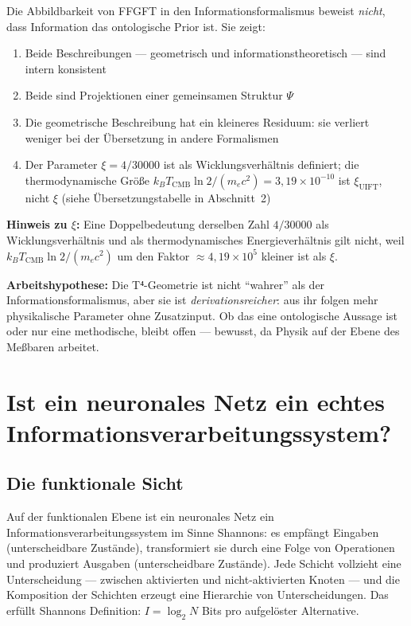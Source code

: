 Die Abbildbarkeit von FFGFT in den Informationsformalismus beweist
\emph{nicht}, dass Information das ontologische Prior ist. Sie zeigt:

\begin{enumerate}
  \item Beide Beschreibungen --- geometrisch und informationstheoretisch
        --- sind intern konsistent
  \item Beide sind Projektionen einer gemeinsamen Struktur $\Psi$
  \item Die geometrische Beschreibung hat ein kleineres Residuum:
        sie verliert weniger bei der Übersetzung in andere Formalismen
  \item Der Parameter $\xi = 4/30000$ ist als Wicklungsverhältnis definiert;
        die thermodynamische Größe $k_B T_\text{CMB} \ln 2 / (m_e c^2) = 3{,}19\times10^{-10}$
        ist $\xi_\text{UIFT}$, nicht $\xi$ (siehe Übersetzungstabelle in Abschnitt~2)
\end{enumerate}

\textbf{Hinweis zu $\xi$:} Eine Doppelbedeutung derselben Zahl $4/30000$ als
Wicklungsverhältnis und als thermodynamisches Energieverhältnis gilt nicht,
weil $k_BT_\text{CMB}\ln2/(m_ec^2)$ um den Faktor $\approx 4{,}19\times10^{5}$
kleiner ist als $\xi$.

\textbf{Arbeitshypothese:} Die T⁴-Geometrie ist nicht ``wahrer'' als
der Informationsformalismus, aber sie ist \emph{derivationsreicher}:
aus ihr folgen mehr physikalische Parameter ohne Zusatzinput.
Ob das eine ontologische Aussage ist oder nur eine methodische,
bleibt offen --- bewusst, da Physik auf der Ebene des Meßbaren arbeitet.


\section{Ist ein neuronales Netz ein echtes Informations\-verarbeitungs\-system?}

\subsection{Die funktionale Sicht}

Auf der funktionalen Ebene ist ein neuronales Netz ein
Informationsverarbeitungssystem im Sinne Shannons: es empfängt Eingaben
(unterscheidbare Zustände), transformiert sie durch eine Folge von
Operationen und produziert Ausgaben (unterscheidbare Zustände). Jede
Schicht vollzieht eine Unterscheidung --- zwischen aktivierten und
nicht-aktivierten Knoten --- und die Komposition der Schichten erzeugt
eine Hierarchie von Unterscheidungen. Das erfüllt Shannons Definition:
$I = \log_2 N$ Bits pro aufgelöster Alternative.

